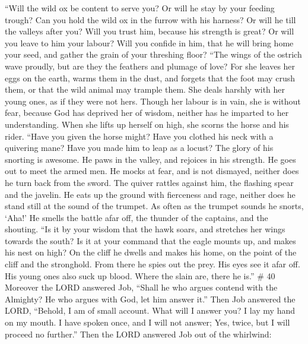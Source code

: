  ``Will the wild ox be content to serve you? Or will he stay
by your feeding trough?  Can you hold the wild ox in the
furrow with his harness? Or will he till the valleys after you?
 Will you trust him, because his strength is great? Or will
you leave to him your labour?  Will you confide in him,
that he will bring home your seed, and gather the grain of your
threshing floor?  ``The wings of the ostrich wave proudly,
but are they the feathers and plumage of love?  For she
leaves her eggs on the earth, warms them in the dust,  and
forgets that the foot may crush them, or that the wild animal may
trample them.  She deals harshly with her young ones, as if
they were not hers. Though her labour is in vain, she is without fear,
 because God has deprived her of wisdom, neither has he
imparted to her understanding.  When she lifts up herself
on high, she scorns the horse and his rider.  ``Have you
given the horse might? Have you clothed his neck with a quivering mane?
 Have you made him to leap as a locust? The glory of his
snorting is awesome.  He paws in the valley, and rejoices
in his strength. He goes out to meet the armed men.  He
mocks at fear, and is not dismayed, neither does he turn back from the
sword.  The quiver rattles against him, the flashing spear
and the javelin.  He eats up the ground with fierceness and
rage, neither does he stand still at the sound of the trumpet.
 As often as the trumpet sounds he snorts, `Aha!' He smells
the battle afar off, the thunder of the captains, and the shouting.
 ``Is it by your wisdom that the hawk soars, and stretches
her wings towards the south?  Is it at your command that
the eagle mounts up, and makes his nest on high?  On the
cliff he dwells and makes his home, on the point of the cliff and the
stronghold.  From there he spies out the prey. His eyes see
it afar off.  His young ones also suck up blood. Where the
slain are, there he is.'' \# 40  Moreover the LORD answered
Job,  ``Shall he who argues contend with the Almighty? He
who argues with God, let him answer it.''  Then Job answered
the LORD,  ``Behold, I am of small account. What will I
answer you? I lay my hand on my mouth.  I have spoken once,
and I will not answer; Yes, twice, but I will proceed no further.''
 Then the LORD answered Job out of the whirlwind:
